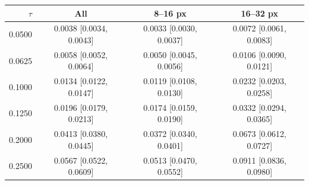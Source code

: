 \begin{tabular}{rccc}
\toprule
$\tau$ & All & 8--16 px & 16--32 px \\
\midrule
0.0500 & 0.0038 [0.0034, 0.0043] & 0.0033 [0.0030, 0.0037] & 0.0072 [0.0061, 0.0083] \\
0.0625 & 0.0058 [0.0052, 0.0064] & 0.0050 [0.0045, 0.0056] & 0.0106 [0.0090, 0.0121] \\
0.1000 & 0.0134 [0.0122, 0.0147] & 0.0119 [0.0108, 0.0130] & 0.0232 [0.0203, 0.0258] \\
0.1250 & 0.0196 [0.0179, 0.0213] & 0.0174 [0.0159, 0.0190] & 0.0332 [0.0294, 0.0365] \\
0.2000 & 0.0413 [0.0380, 0.0445] & 0.0372 [0.0340, 0.0401] & 0.0673 [0.0612, 0.0727] \\
0.2500 & 0.0567 [0.0522, 0.0609] & 0.0513 [0.0470, 0.0552] & 0.0911 [0.0836, 0.0980] \\
\bottomrule
\end{tabular}
